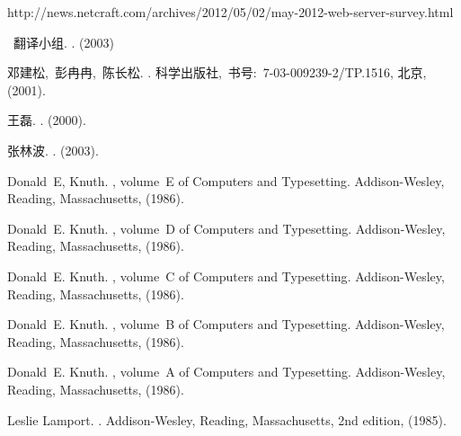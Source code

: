 \fontsize{10.5pt}{10.5pt}\selectfont
\begin{thebibliography}{10}



http://news.netcraft.com/archives/2012/05/02/may-2012-web-server-survey.html


\CTeX{}~翻译小组.
.
\newblock (2003)


{邓建松,~彭冉冉,~陈长松}.
.
\newblock 科学出版社,~书号:~7-03-009239-2/TP.1516, 北京, (2001).

王磊.
.
\newblock (2000).

张林波.
.
\newblock (2003).

Donald~E, Knuth.
, volume~E of {Computers and
  Typesetting}.
\newblock Addison-Wesley, Reading, Massachusetts, (1986).

Donald~E. Knuth.
, volume~D of {Computers and
  Typesetting}.
\newblock Addison-Wesley, Reading, Massachusetts, (1986).

Donald~E. Knuth.
, volume~C of {Computers and
  Typesetting}.
\newblock Addison-Wesley, Reading, Massachusetts, (1986).

Donald~E. Knuth.
, volume~B of { Computers and
  Typesetting}.
\newblock Addison-Wesley, Reading, Massachusetts, (1986).

Donald~E. Knuth.
, volume~A of {Computers and Typesetting}.
\newblock Addison-Wesley, Reading, Massachusetts, (1986).

Leslie Lamport.
.
\newblock Addison-Wesley, Reading, Massachusetts, 2nd edition, (1985).

\end{thebibliography}
